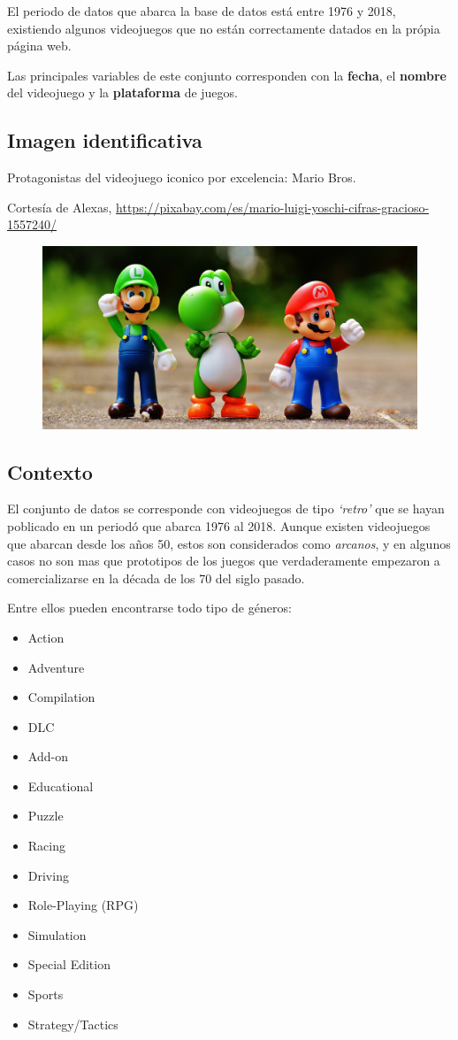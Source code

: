 \documentclass[]{article}
\providecommand{\tightlist}{%
  \setlength{\itemsep}{0pt}\setlength{\parskip}{0pt}}
\begin{document}
El periodo de datos que abarca la base de datos está entre 1976 y 2018,
existiendo algunos videojuegos que no están correctamente datados en la
própia página web.

Las principales variables de este conjunto corresponden con la
\textbf{fecha}, el \textbf{nombre} del videojuego y la
\textbf{plataforma} de juegos.

\subsection{Imagen identificativa}\label{imagen-identificativa}

Protagonistas del videojuego iconico por excelencia: Mario Bros.

Cortesía de Alexas,
\url{https://pixabay.com/es/mario-luigi-yoschi-cifras-gracioso-1557240/}

\begin{figure}[h!]
  \centering
  \includegraphics[width=.8\textwidth]{mario-1557240_1920.jpg}
\end{figure}

\subsection{Contexto}\label{contexto}

El conjunto de datos se corresponde con videojuegos de tipo
\emph{`retro'} que se hayan poblicado en un periodó que abarca 1976 al
2018. Aunque existen videojuegos que abarcan desde los años 50, estos
son considerados como \emph{arcanos}, y en algunos casos no son mas que
prototipos de los juegos que verdaderamente empezaron a comercializarse
en la década de los 70 del siglo pasado.

Entre ellos pueden encontrarse todo tipo de géneros:

\begin{itemize}
\tightlist
\item
  Action
\item
  Adventure
\item
  Compilation
\item
  DLC
\item
  Add-on
\item
  Educational
\item
  Puzzle
\item
  Racing
\item
  Driving
\item
  Role-Playing (RPG)
\item
  Simulation
\item
  Special Edition
\item
  Sports
\item
  Strategy/Tactics
\end{itemize}
\end{document}

